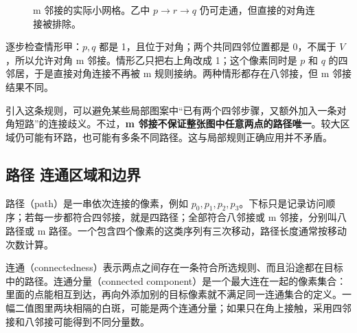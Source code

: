 \begin{figure}[htbp]
\centering
{}
\caption{m 邻接的实际小网格。乙中 $p\to r\to q$ 仍可走通，但直接的对角连接被排除。}
\label{fig:foundation-madj}
\end{figure}

逐步检查情形甲：$p,q$ 都是 1，且位于对角；两个共同四邻位置都是 0，不属于 $V$，所以允许对角 m 邻接。情形乙只把右上角改成 1；这个像素同时是 $p$ 和 $q$ 的四邻居，于是直接对角连接不再被 m 规则接纳。两种情形都存在八邻接，但 m 邻接结果不同。

引入这条规则，可以避免某些局部图案中“已有两个四邻步骤，又额外加入一条对角短路”的连接歧义。不过，\textbf{m 邻接不保证整张图中任意两点的路径唯一}。较大区域仍可能有环路，也可能有多条不同路径。这与局部规则正确应用并不矛盾。

\subsection{路径 连通区域和边界}

路径（path）是一串依次连接的像素，例如 $p_0,p_1,p_2,p_3$。下标只是记录访问顺序；若每一步都符合四邻接，就是四路径；全部符合八邻接或 m 邻接，分别叫八路径或 m 路径。一个包含四个像素的这类序列有三次移动，路径长度通常按移动次数计算。

连通（connectedness）表示两点之间存在一条符合所选规则、而且沿途都在目标中的路径。连通分量（connected component）是一个最大连在一起的像素集合：里面的点能相互到达，再向外添加别的目标像素就不满足同一连通集合的定义。一幅二值图里两块相隔的白斑，可能是两个连通分量；如果只在角上接触，采用四邻接和八邻接可能得到不同分量数。

